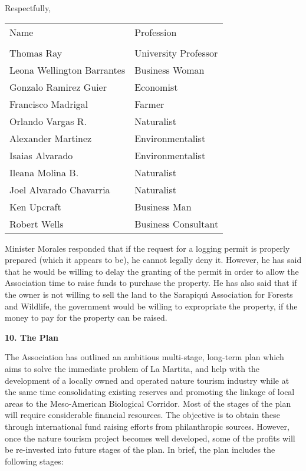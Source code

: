 \begin{center}
                          Respectfully,\\
\vspace{.5cm}
\begin{tabular}{ll}
     Name                          &        Profession\\
\\
     Thomas Ray                    &        University Professor\\
     Leona Wellington Barrantes    &        Business Woman\\
     Gonzalo Ramirez Guier         &        Economist\\
     Francisco Madrigal            &        Farmer\\
     Orlando Vargas R.             &        Naturalist\\
     Alexander Martinez            &        Environmentalist\\
     Isaias Alvarado               &        Environmentalist\\
     Ileana Molina B.              &        Naturalist\\
     Joel Alvarado Chavarria       &        Naturalist\\
     Ken Upcraft                   &        Business Man\\
     Robert Wells                  &        Business Consultant\\
\end{tabular}
\end{center}

Minister Morales responded that if the request for a logging permit
is properly prepared (which it appears to be), he cannot legally
deny it.  However, he has said that he would be willing to delay the
granting of the permit in order to allow the Association time to
raise funds to purchase the property.  He has also said that if the
owner is not willing to sell the land to the Sarapiqu\'{\i} Association
for Forests and Wildlife, the government would be willing to expropriate
the property, if the money to pay for the property can be raised. 

\LP
{\large {\bf 10.  The Plan}}
\eLP

The Association has outlined an ambitious multi-stage, long-term
plan which aims to solve the immediate problem of La Martita, and
help with the development of a locally owned and operated
nature tourism industry while at the same time consolidating existing
reserves and promoting the linkage of local areas to the Meso-American
Biological Corridor.  Most of the stages of the plan will require
considerable financial resources.  The objective is to obtain these
through international fund raising efforts from philanthropic sources.
However, once the nature tourism project becomes well developed, some
of the profits will be re-invested into future stages of the plan.
In brief, the plan includes the following stages:

